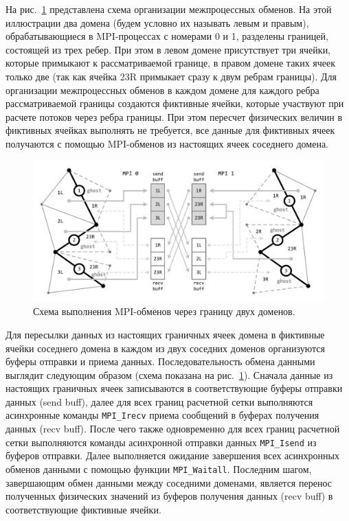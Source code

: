 На рис.~\ref{fig:text_2_scaling_mpi} представлена схема организации межпроцессных обменов.
На этой иллюстрации два домена (будем условно их называть левым и правым), обрабатывающиеся в MPI-процессах\label{abbr:mpi-5} с номерами 0 и 1, разделены границей, состоящей из трех ребер.
При этом в левом домене присутствует три ячейки, которые примыкают к рассматриваемой границе, в правом домене таких ячеек только две (так как ячейка 23R примыкает сразу к двум ребрам границы).
Для организации межпроцессных обменов в каждом домене для каждого ребра рассматриваемой границы создаются фиктивные ячейки, которые участвуют при расчете потоков через ребра границы.
При этом пересчет физических величин в фиктивных ячейках выполнять не требуется, все данные для фиктивных ячеек получаются с помощью MPI-обменов из настоящих ячеек соседнего домена.

\begin{figure}[ht]
\centering
\includegraphics[width=1.0\textwidth]{fig/par_surf_mpi.pdf}
\singlespacing
{}\caption{Схема выполнения MPI-обменов через границу двух доменов.}\label{fig:text_2_scaling_mpi}
\end{figure}

Для пересылки данных из настоящих граничных ячеек домена в фиктивные ячейки соседнего домена в каждом из двух соседних доменов организуются буферы отправки и приема данных.
Последовательность обмена данными выглядит следующим образом (схема показана на рис.~\ref{fig:text_2_scaling_mpi}).
Сначала данные из настоящих граничных ячеек записываются в соответствующие буферы отправки данных (send buff), далее для всех границ расчетной сетки выполняются асинхронные команды \texttt{MPI\_Irecv} приема сообщений в буферах получения данных (recv buff).
После чего также одновременно для всех границ расчетной сетки выполняются команды асинхронной отправки данных \texttt{MPI\_Isend} из буферов отправки.
Далее выполняется ожидание завершения всех асинхронных обменов данными с помощью функции \texttt{MPI\_Waitall}.
Последним шагом, завершающим обмен данными между соседними доменами, является перенос полученных физических значений из буферов получения данных (recv buff) в соответствующие фиктивные ячейки.

